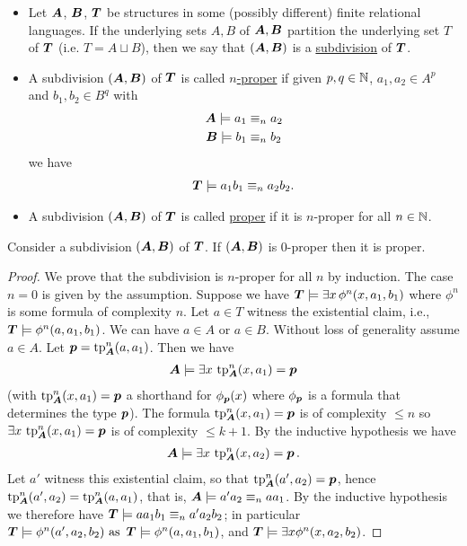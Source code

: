 \documentclass{amsart}
\DeclareMathOperator{\TT}{\boldface T}
\DeclareMathOperator{\AT}{\boldface A}
\DeclareMathOperator{\BT}{\boldface B}
\newcommand{\defn}{\underline}
\begin{document}
\begin{Definition}
  \begin{itemize}
  \item Let $\AT$, $\BT$, $\TT$ be structures in some (possibly different) finite relational languages. If the underlying sets $A, B$ of $\AT, \BT$ partition the underlying set $T$ of $\TT$ (i.e. $T = A \sqcup B$), then we say that $(\AT, \BT)$ is a \defn{subdivision} of $\TT$.
  \item A subdivision $(\AT, \BT)$ of $\TT$ is called \defn{$n$-proper} if given $p,q \in \mathbb{N}$,  $a_1, a_2 \in A^p$ and $b_1, b_2 \in B^q$ with
    \begin{align*}
      \AT \models a_1 &\equiv_n a_2 \\
      \BT \models b_1 &\equiv_n b_2
    \end{align*}
    we have
    \begin{align*}
      \TT \models a_1b_1 \equiv_n a_2b_2.
    \end{align*}
  \item A subdivision $(\AT, \BT)$ of $\TT$ is called \defn{proper} if it is $n$-proper for all $n \in \mathbb{N}$.
  \end{itemize}
\end{Definition}

\begin{Lemma} \label{lm_subdivision}
  Consider a subdivision $(\AT, \BT)$ of $\TT$. If $(\AT, \BT)$ is $0$-proper then it is proper.
\end{Lemma}

\begin{proof}
  We prove that the subdivision is $n$-proper for all $n$ by induction.
  The case $n = 0$ is given by the assumption.
  Suppose we have $\TT \models \exists x \, \phi^n(x, a_1, b_1)$ where $\phi^n$ is some formula of complexity $n$. Let $a \in T$ witness the existential claim, i.e., $\TT \models \phi^n(a, a_1, b_1)$. We can have $a \in A$ or $a \in B$. Without loss of generality assume $a \in A$. Let $\pp = \tp^n_{\AT} (a, a_1)$. Then we have 
  \begin{align*}
    \AT \models \exists x \, \tp^n_{\AT}(x, a_1) = \pp
  \end{align*}
  (with $\tp^n_{\AT}(x, a_1) = \pp$ a shorthand for $\phi_{\operatorname{\boldsymbol p}}(x)$ where $\phi_{\operatorname{\boldsymbol p}}$ is a formula that determines the type $\operatorname{\boldsymbol p}$).
  The formula $\tp^n_{\AT}(x, a_1) = \pp$ is of complexity $\leq n$ so $\exists x \, \tp^n_{\AT}(x, a_1) = \pp$ is of complexity $\leq k+1$. By the inductive hypothesis we have
  \begin{align*}
    \AT \models \exists x \, \tp^n_{\AT}(x, a_2) = \pp.
  \end{align*}
  Let $a'$ witness this existential claim, so that $\tp^n_{\AT}(a', a_2) = \pp$, hence $\tp^n_{\AT}(a', a_2) = \tp^n_{\AT}(a, a_1)$, that is,
  $\AT \models a'a_2 \equiv_n aa_1$. By the inductive hypothesis we therefore have
  $\TT \models aa_1b_1 \equiv_n a'a_2b_2$; in particular $\TT \models \phi^n(a', a_2, b_2)  \text { as } \TT \models \phi^n(a, a_1, b_1)$,
  and $\TT \models \exists x \phi^n(x, a_2, b_2)$.
\end{proof}
\end{document}
